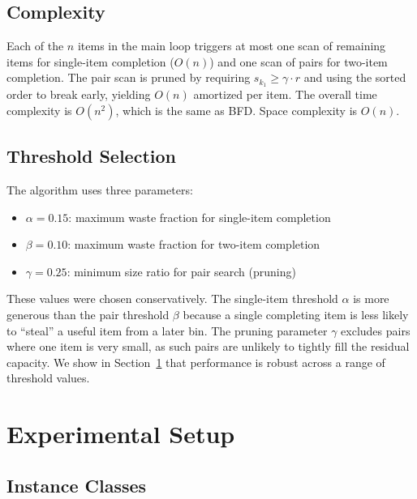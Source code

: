 \documentclass[11pt]{article}
\begin{document}
\subsection{Complexity}

Each of the $n$ items in the main loop triggers at most one scan of remaining items
for single-item completion ($O(n)$) and one scan of pairs for two-item completion.
The pair scan is pruned by requiring $s_{k_1} \geq \gamma \cdot r$ and using the
sorted order to break early, yielding $O(n)$ amortized per item. The overall time
complexity is $O(n^2)$, which is the same as BFD. Space complexity is $O(n)$.

\subsection{Threshold Selection}

The algorithm uses three parameters:
\begin{itemize}[nosep]
  \item $\alpha = 0.15$: maximum waste fraction for single-item completion
  \item $\beta = 0.10$: maximum waste fraction for two-item completion
  \item $\gamma = 0.25$: minimum size ratio for pair search (pruning)
\end{itemize}

These values were chosen conservatively. The single-item threshold $\alpha$ is more
generous than the pair threshold $\beta$ because a single completing item is less
likely to ``steal'' a useful item from a later bin. The pruning parameter $\gamma$
excludes pairs where one item is very small, as such pairs are unlikely to tightly fill
the residual capacity. We show in Section~\ref{sec:experiments} that performance is
robust across a range of threshold values.

\section{Experimental Setup}
\label{sec:experiments}

\subsection{Instance Classes}
\end{document}
